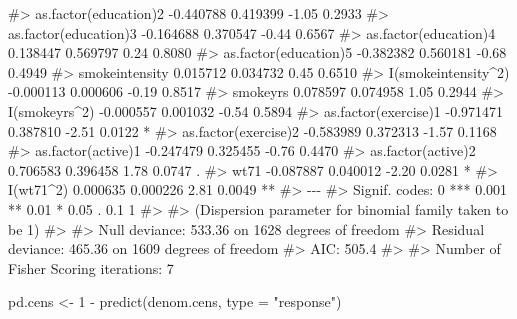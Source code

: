 \documentclass[
  10pt,
  a4paper,
]{book}
\newenvironment{Shaded}{\begin{snugshade}}{\end{snugshade}}
\newcommand{\AttributeTok}[1]{\textcolor[rgb]{0.40,0.45,0.13}{#1}}
\newcommand{\CommentTok}[1]{\textcolor[rgb]{0.37,0.37,0.37}{#1}}
\newcommand{\DecValTok}[1]{\textcolor[rgb]{0.68,0.00,0.00}{#1}}
\newcommand{\FunctionTok}[1]{\textcolor[rgb]{0.28,0.35,0.67}{#1}}
\newcommand{\NormalTok}[1]{\textcolor[rgb]{0.00,0.46,0.62}{#1}}
\newcommand{\OtherTok}[1]{\textcolor[rgb]{0.00,0.46,0.62}{#1}}
\newcommand{\SpecialCharTok}[1]{\textcolor[rgb]{0.37,0.37,0.37}{#1}}
\newcommand{\StringTok}[1]{\textcolor[rgb]{0.13,0.47,0.30}{#1}}
\begin{document}
\begin{Shaded}
\begin{Highlighting}[]
\CommentTok{\#\textgreater{} as.factor(education)2 {-}0.440788   0.419399   {-}1.05   0.2933   }
\CommentTok{\#\textgreater{} as.factor(education)3 {-}0.164688   0.370547   {-}0.44   0.6567   }
\CommentTok{\#\textgreater{} as.factor(education)4  0.138447   0.569797    0.24   0.8080   }
\CommentTok{\#\textgreater{} as.factor(education)5 {-}0.382382   0.560181   {-}0.68   0.4949   }
\CommentTok{\#\textgreater{} smokeintensity         0.015712   0.034732    0.45   0.6510   }
\CommentTok{\#\textgreater{} I(smokeintensity\^{}2)   {-}0.000113   0.000606   {-}0.19   0.8517   }
\CommentTok{\#\textgreater{} smokeyrs               0.078597   0.074958    1.05   0.2944   }
\CommentTok{\#\textgreater{} I(smokeyrs\^{}2)         {-}0.000557   0.001032   {-}0.54   0.5894   }
\CommentTok{\#\textgreater{} as.factor(exercise)1  {-}0.971471   0.387810   {-}2.51   0.0122 * }
\CommentTok{\#\textgreater{} as.factor(exercise)2  {-}0.583989   0.372313   {-}1.57   0.1168   }
\CommentTok{\#\textgreater{} as.factor(active)1    {-}0.247479   0.325455   {-}0.76   0.4470   }
\CommentTok{\#\textgreater{} as.factor(active)2     0.706583   0.396458    1.78   0.0747 . }
\CommentTok{\#\textgreater{} wt71                  {-}0.087887   0.040012   {-}2.20   0.0281 * }
\CommentTok{\#\textgreater{} I(wt71\^{}2)              0.000635   0.000226    2.81   0.0049 **}
\CommentTok{\#\textgreater{} {-}{-}{-}}
\CommentTok{\#\textgreater{} Signif. codes:  0 \textquotesingle{}***\textquotesingle{} 0.001 \textquotesingle{}**\textquotesingle{} 0.01 \textquotesingle{}*\textquotesingle{} 0.05 \textquotesingle{}.\textquotesingle{} 0.1 \textquotesingle{} \textquotesingle{} 1}
\CommentTok{\#\textgreater{} }
\CommentTok{\#\textgreater{} (Dispersion parameter for binomial family taken to be 1)}
\CommentTok{\#\textgreater{} }
\CommentTok{\#\textgreater{}     Null deviance: 533.36  on 1628  degrees of freedom}
\CommentTok{\#\textgreater{} Residual deviance: 465.36  on 1609  degrees of freedom}
\CommentTok{\#\textgreater{} AIC: 505.4}
\CommentTok{\#\textgreater{} }
\CommentTok{\#\textgreater{} Number of Fisher Scoring iterations: 7}

\NormalTok{pd.cens }\OtherTok{\textless{}{-}} \DecValTok{1} \SpecialCharTok{{-}} \FunctionTok{predict}\NormalTok{(denom.cens, }\AttributeTok{type =} \StringTok{"response"}\NormalTok{)}


\end{Highlighting}
\end{Shaded}
\end{document}
